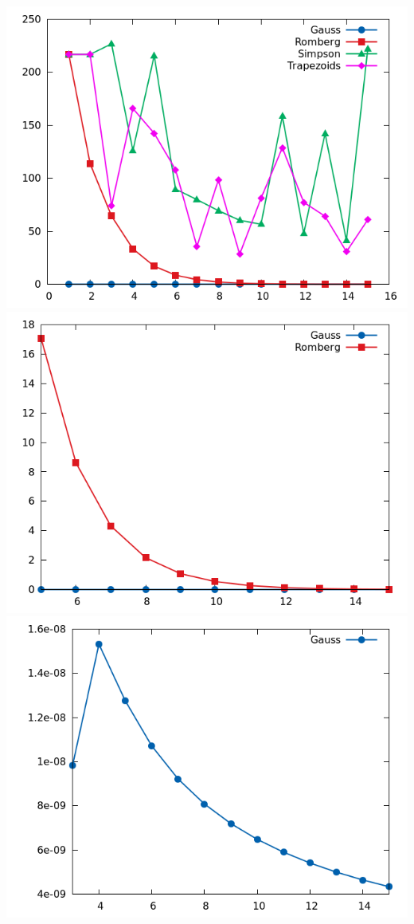\documentclass[11pt,leqno]{article}
\begin{document}
\begin{center}
\includegraphics[scale=0.65,natwidth=640,natheight=480]{plot/test3_15e.png}\\
\includegraphics[scale=0.65,natwidth=640,natheight=480]{plot/test3_15ezoom.png}\\
\includegraphics[scale=0.65,natwidth=640,natheight=480]{plot/test3_g15ezoom.png}
\end{center}
\end{document}

